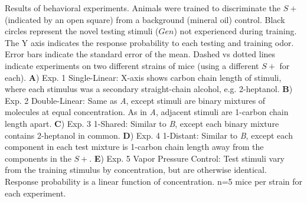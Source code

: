 \label{fig:results}
Results of behavioral experiments. Animals were trained to discriminate the $S+$ (indicated by an open square) from a background (mineral oil) control. Black circles represent the novel testing stimuli ($Gen$) not experienced during training. The Y axis indicates the response probability to each testing and training odor. Error bars indicate the standard error of the mean.  Dashed vs dotted lines indicate experiments on two different strains of mice (using a different $S+$ for each). \textbf{A}) Exp. 1 Single-Linear:  X-axis shows carbon chain length of stimuli, where each stimulus was a secondary straight-chain alcohol, e.g. 2-heptanol.  \textbf{B})  Exp. 2 Double-Linear: Same as \textit{A}, except stimuli are binary mixtures of molecules at equal concentration.  As in \textit{A}, adjacent stimuli are 1-carbon chain length apart. \textbf{C}) Exp. 3 1-Shared: Similar to \textit{B}, except each binary mixture contains 2-heptanol in common. \textbf{D})  Exp. 4 1-Distant: Similar to \textit{B}, except each component in each test mixture is 1-carbon chain length away from the components in the $S+$. \textbf{E}) Exp. 5 Vapor Pressure Control: Test stimuli vary from the training stimulus by concentration, but are otherwise identical. Response probability is a linear function of concentration.  n=5 mice per strain for each experiment.  